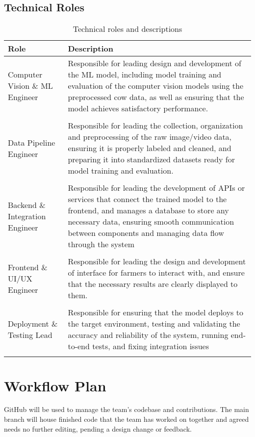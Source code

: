 \documentclass{article}
\begin{document}
\subsection{Technical Roles}
\begin{table}[H]
\centering
\caption{Technical roles and descriptions}
\label{tab:technical-roles}
\begin{tabularx}{\textwidth}{lX}
\toprule
\textbf{Role} & \textbf{Description} \\
\midrule

Computer Vision \& ML Engineer & Responsible for leading design and development of the ML model, including model training and evaluation of the computer vision models using the preprocessed cow data, as well as ensuring that the model achieves satisfactory performance.\\ \\
Data Pipeline Engineer &  Responsible for leading the collection, organization and preprocessing of the raw image/video data, ensuring it is properly labeled and cleaned, and preparing it into standardized datasets ready for model training and evaluation.\\ \\
Backend \& Integration Engineer  & Responsible for leading the development of APIs or services that connect the trained model to the frontend, and manages a database to store any necessary data, ensuring smooth communication between components and managing data flow through the system \\ \\
Frontend \& UI/UX Engineer  & Responsible for leading the design and development of interface for farmers to interact with, and ensure that the necessary results are clearly displayed to them. \\ \\
Deployment \& Testing Lead & Responsible for ensuring that the model deploys to the target environment, testing and validating the accuracy and reliability of the system, running end-to-end tests, and fixing integration issues\\ \\
\bottomrule
\end{tabularx}
\end{table}


\section{Workflow Plan}

GitHub will be used to manage the team’s codebase and contributions. The main branch will house finished code that the team has worked on together and agreed needs no further editing, pending a design change or feedback.\\  
\end{document}
